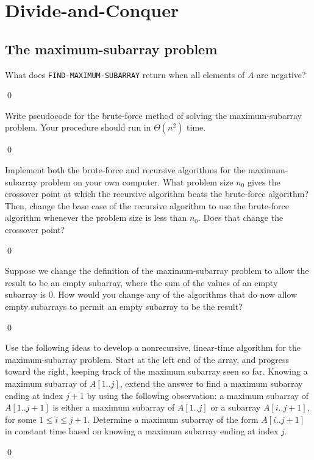 \chapter{Divide-and-Conquer}
\section{The maximum-subarray problem}

 What does \verb|FIND-MAXIMUM-SUBARRAY| return when all elements of $A$ are negative?

\sol \qed

 Write pseudocode for the brute-force method of solving the maximum-subarray problem. Your procedure should run in $\Theta(n^2)$ time.

\sol \qed

 Implement both the brute-force and recursive algorithms for the maximum-subarray problem on your own computer. What problem size $n_0$ gives the crossover point at which the recursive algorithm beats the brute-force algorithm? Then, change the base case of the recursive algorithm to use the brute-force algorithm whenever the problem size is less than $n_0$. Does that change the crossover point?

\sol \qed

 Suppose we change the definition of the maximum-subarray problem to allow the result to be an empty subarray, where the sum of the values of an empty subarray is 0. How would you change any of the algorithms that do now allow empty subarrays to permit an empty subarray to be the result?

\sol \qed

 Use the following ideas to develop a nonrecursive, linear-time algorithm for the maximum-subarray problem. Start at the left end of the array, and progress toward the right, keeping track of the maximum subarray seen so far. Knowing a maximum subarray of $A[1..j]$, extend the answer to find a maximum subarray ending at index $j+1$ by using the following observation: a maximum subarray of $A[1..j+1]$ is either a maximum subarray of $A[1..j]$ or a subarray $A[i..j+1]$, for some $1 \leq i \leq j+1$. Determine a maximum subarray of the form $A[i..j+1]$ in constant time based on knowing a maximum subarray ending at index $j$.

\sol \qed